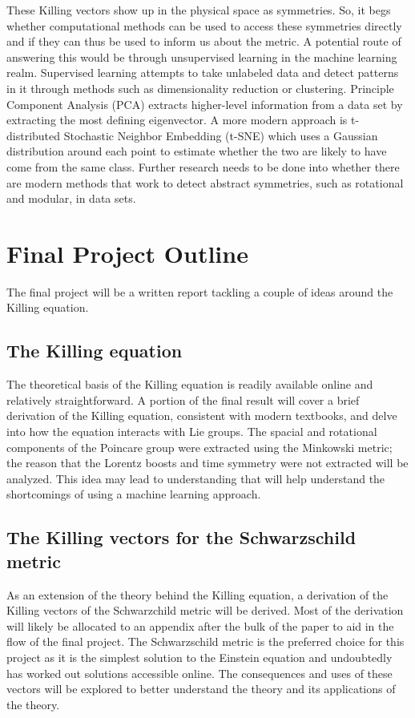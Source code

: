 \documentclass[twoside,11pt]{article}
\begin{document}
These Killing vectors show up in the physical space as symmetries. So, it begs whether computational methods can be used to access these symmetries directly and if they can thus be used to inform us about the metric. A potential route of answering this would be through unsupervised learning in the machine learning realm. Supervised learning attempts to take unlabeled data and detect patterns in it through methods such as dimensionality reduction or clustering. Principle Component Analysis (PCA) extracts higher-level information from a data set by extracting the most defining eigenvector. A more modern approach is t-distributed Stochastic Neighbor Embedding (t-SNE) which uses a Gaussian distribution around each point to estimate whether the two are likely to have come from the same class. Further research needs to be done into whether there are modern methods that work to detect abstract symmetries, such as rotational and modular, in data sets. 

\section{Final Project Outline}
The final project will be a written report tackling a couple of ideas around the Killing equation.

\subsection{The Killing equation}
The theoretical basis of the Killing equation is readily available online and relatively straightforward. A portion of the final result will cover a brief derivation of the Killing equation, consistent with modern textbooks, and delve into how the equation interacts with Lie groups. The spacial and rotational components of the Poincare group were extracted using the Minkowski metric; the reason that the Lorentz boosts and time symmetry were not extracted will be analyzed. This idea may lead to understanding that will help understand the shortcomings of using a machine learning approach. 

\subsection{The Killing vectors for the Schwarzschild metric} 
As an extension of the theory behind the Killing equation, a derivation of the Killing vectors of the Schwarzchild metric will be derived. Most of the derivation will likely be allocated to an appendix after the bulk of the paper to aid in the flow of the final project. The Schwarzschild metric is the preferred choice for this project as it is the simplest solution to the Einstein equation and undoubtedly has worked out solutions accessible online. The consequences and uses of these vectors will be explored to better understand the theory and its applications of the theory.
\end{document}
